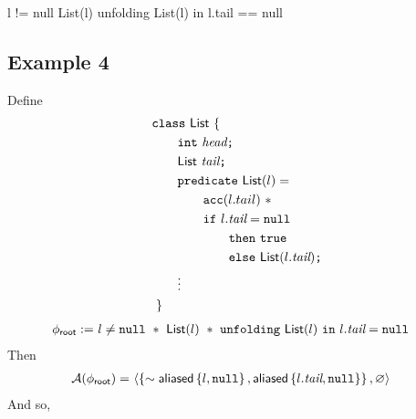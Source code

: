 %
l != null List(l) unfolding List(l) in l.tail == null

\newpage
\subsection*{Example 4}

\renewcommand{\int}{\ttt{int}}
\newcommand{\IntList}{\tsf{IntList}}
\newcommand{\List}{\tsf{List}}
\newcommand{\vhead}{\tit{head}}
\newcommand{\vtail}{\tit{tail}}
\newcommand{\ctrue}{\ttt{true}}

Define
\begin{align*}
&\hspace{0em} \ttt{class} \ \List \ \{ \\
&\hspace{2em}   \int \ \vhead \ttt{;} \\
&\hspace{2em}   \List \ \vtail \ttt{;} \\
&\hspace{2em}   \ttt{predicate} \ \List(l) = \\
&\hspace{4em}     \cacc(l.tail) \ \ast \\
&\hspace{4em}     \cif \ l.\vtail = \cnull \\
&\hspace{6em}       \cthen \ \ctrue \\
&\hspace{6em}       \celse \ \List(l.\vtail)
                \ttt{;} \\
&\hspace{2em} \vdots \\
&\hspace{0em} \ \}
\end{align*}
%
\begin{align*}
\phiroot := & \
l \neq \cnull \ \ast \
\List(l) \ \ast \
\cunfolding \ \List(l) \ \cin \ l.\vtail = \cnull
\end{align*}
Then
\begin{align*}
\A(\phiroot) = & \
\context
  { \set{ \pnot \aliased\set{l, \cnull}, \aliased\set{l.\vtail, \cnull} } }
  { \empty }
\end{align*}
And so,
